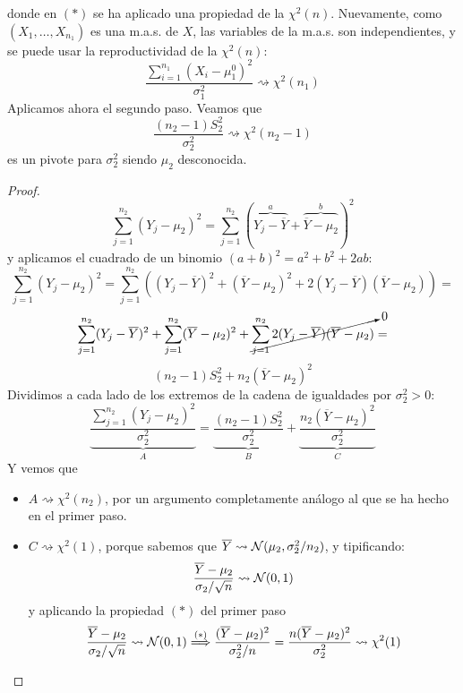 \documentclass[12pt]{article}
\begin{document}
\begin{ejercicio}
\begin{enumerate}[label=\alph*)]
                donde en $(*)$ se ha aplicado una propiedad de la $\chi^2(n)$. Nuevamente, como $(X_1, \ldots, X_{n_1})$ es una m.a.s. de $X$,
                las variables de la m.a.s. son independientes, y se puede usar la reproductividad de la $\chi^2(n)$:
                $$\dfrac{\displaystyle\sum_{i=1}^{n_1}(X_i - \mu_1^0)^2}{\sigma_1^2} \rightsquigarrow \chi^2(n_1)$$
                Aplicamos ahora el segundo paso. Veamos que $$\dfrac{(n_2-1)S_2^2}{\sigma_2^2} \rightsquigarrow \chi^2(n_2-1)$$
                es un pivote para $\sigma_2^2$ siendo $\mu_2$ desconocida.
                \begin{proof}
                    $$\sum_{j=1}^{n_2} (Y_j - \mu_2)^2 = \sum_{j=1}^{n_2} (\overbrace{Y_j - \overline{Y}}^{a} + 
                    \overbrace{\overline{Y} - \mu_2}^{b})^2$$
                    y aplicamos el cuadrado de un binomio $(a+b)^2 = a^2 + b^2 + 2ab$:
                    $$\sum_{j=1}^{n_2} (Y_j - \mu_2)^2 = \sum_{j=1}^{n_2} ((Y_j - \overline{Y})^2 + (\overline{Y} - \mu_2)^2
                    + 2 (Y_j - \overline{Y})(\overline{Y} - \mu_2)) = $$
                    $$\sum_{j=1}^{n_2} (Y_j - \overline{Y})^2 + \sum_{j=1}^{n_2} (\overline{Y} - \mu_2)^2 + 
                    \cancelto{0}{\sum_{j=1}^{n_2} 2 (Y_j - \overline{Y})(\overline{Y} - \mu_2)} = $$
                    $$(n_2-1)S_2^2 + n_2 (\overline{Y} - \mu_2)^2$$
                    Dividimos a cada lado de los extremos de la cadena de igualdades por $\sigma_2^2 > 0$:
                    $$\underbrace{\dfrac{\sum_{j=1}^{n_2} (Y_j - \mu_2)^2}{\sigma_2^2}}_{A} = 
                    \underbrace{\dfrac{(n_2-1)S_2^2}{\sigma_2^2}}_B + 
                    \underbrace{\dfrac{n_2 (\overline{Y} - \mu_2)^2}{\sigma_2^2}}_C$$
                    Y vemos que 
                    \begin{itemize}
                        \item $A \rightsquigarrow \chi^2(n_2)$, por un argumento completamente análogo al que se ha hecho en el primer paso.
                        \item $C \rightsquigarrow \chi^2(1)$, porque sabemos que $\overline{Y} \rightsquigarrow \mathcal{N}(\mu_2, \sigma_2^2/n_2)$,
                        y tipificando:
                        $$\dfrac{\overline{Y} - \mu_2}{\sigma_2 / \sqrt{n}} \rightsquigarrow \mathcal{N}(0,1)$$
                        y aplicando la propiedad $(*)$ del primer paso
                        $$\dfrac{\overline{Y} - \mu_2}{\sigma_2 / \sqrt{n}} \rightsquigarrow \mathcal{N}(0,1) \stackrel{(*)}{\Longrightarrow}
                        \dfrac{(\overline{Y} - \mu_2)^2}{\sigma_2^2 / n} = \dfrac{n(\overline{Y} - \mu_2)^2}{\sigma_2^2} \rightsquigarrow \chi^2(1)$$

\end{itemize}
\end{proof}
\end{enumerate}
\end{ejercicio}
\end{document}
